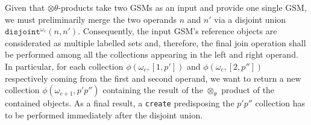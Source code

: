 %
%


\label{def:otimesthetaList} 
Given that $\otimes\theta$-products take two GSMs as an input and provide one single GSM, we must 
preliminarily merge the two operands $n$ and $n'$ via a disjoint union $\texttt{disjoint}^{\omega_c}(n, n')$. Consequently, the input GSM's reference objects are considerated as multiple labelled sets and, therefore, the final join operation shall be performed among all the collections appearing in the left and right  operand. In particular, for each collection $\phi(\omega_c,[1,p'])$ and $\phi(\omega_c,[2,p''])$ respectively coming from the first and second operand, we want to return a new collection $\phi(\omega_{c+1},p'p'')$ containing the result of the $\otimes_\theta$ product of the contained objects. As a final result, a \texttt{create} predisposing the $p'p''$ collection has to be performed immediately after the disjoint union.%

